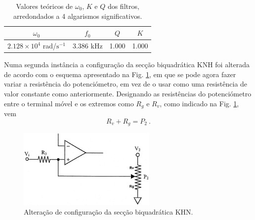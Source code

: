 \begin{table}[h!]
    \centering
     \caption{Valores teóricos de $\omega_0$, $K$ e $Q$ dos filtros, arredondados a 4 algarismos significativos.}
    \begin{tabular}{cccc}
        \hline
         $\omega_0$ & $f_0$ & $Q$ & $K$ \\
         \hline
         $2.128 \times 10^{4}$ rad/$\mathrm{s^{-1}}$ & 3.386 kHz & 1.000 & 1.000\\
          \hline
    \end{tabular}
   
    \label{tab:parKHN}
\end{table}

Numa segunda instância a configuração da secção biquadrática KNH foi alterada de acordo com o esquema apresentado na Fig. \ref{fig:KNH_pot}, em que se pode agora fazer variar a resistência do potenciómetro, em vez de o usar como uma resistência de valor constante como anteriormente. Designando as resistências do potenciómetro entre o terminal móvel e os extremos como $R_g$ e $R_v$, como indicado na Fig. \ref{fig:KNH_pot}, vem 
\begin{equation}
    R_v + R_g = P_2\:.
    \label{eq:rv_rg}
\end{equation}

\begin{figure}[h!]
    \centering
    \includegraphics[width = 0.6\textwidth]{Imagens/KNH_pot.png}
    \caption{Alteração de configuração da secção biquadrática KHN.}
    \label{fig:KNH_pot}
\end{figure}

